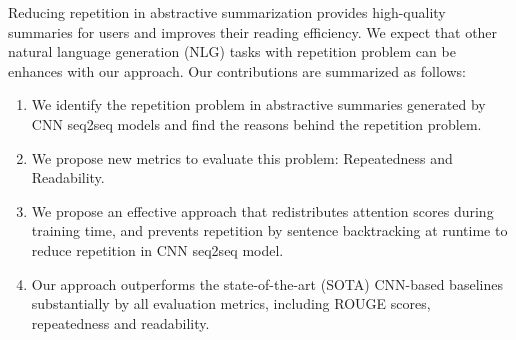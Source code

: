 

Reducing repetition in abstractive summarization provides high-quality summaries for users and improves their reading efficiency.
We expect that other natural language generation (NLG) tasks with repetition problem can be enhances with our approach. 
Our contributions are summarized as follows:
\begin{enumerate}
\item We identify the repetition problem in abstractive summaries generated
by CNN seq2seq models and find the reasons behind the repetition problem.
\item We propose new metrics to evaluate this problem: Repeatedness and Readability.
\item We propose an effective approach that redistributes attention scores 
during training time, and prevents repetition by sentence backtracking
at runtime to reduce repetition in CNN seq2seq model.
\item Our approach
outperforms the state-of-the-art (SOTA) CNN-based baselines 
substantially by all evaluation metrics, including ROUGE scores, 
repeatedness and readability.
\end{enumerate}
